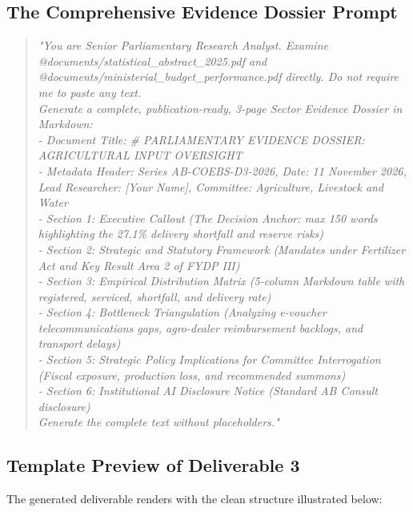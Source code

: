 \documentclass[11pt, a4paper]{report}
\begin{document}
\subsection{The Comprehensive Evidence Dossier Prompt}
\begin{quote}
\small
\textit{"You are Senior Parliamentary Research Analyst. Examine @documents/statistical\_abstract\_2025.pdf and @documents/ministerial\_budget\_performance.pdf directly. Do not require me to paste any text. \\
Generate a complete, publication-ready, 3-page Sector Evidence Dossier in Markdown: \\
- Document Title: \# PARLIAMENTARY EVIDENCE DOSSIER: AGRICULTURAL INPUT OVERSIGHT \\
- Metadata Header: Series AB-COEBS-D3-2026, Date: 11 November 2026, Lead Researcher: [Your Name], Committee: Agriculture, Livestock and Water \\
- Section 1: Executive Callout (The Decision Anchor: max 150 words highlighting the 27.1\% delivery shortfall and reserve risks) \\
- Section 2: Strategic and Statutory Framework (Mandates under Fertilizer Act and Key Result Area 2 of FYDP III) \\
- Section 3: Empirical Distribution Matrix (5-column Markdown table with registered, serviced, shortfall, and delivery rate) \\
- Section 4: Bottleneck Triangulation (Analyzing e-voucher telecommunications gaps, agro-dealer reimbursement backlogs, and transport delays) \\
- Section 5: Strategic Policy Implications for Committee Interrogation (Fiscal exposure, production loss, and recommended summons) \\
- Section 6: Institutional AI Disclosure Notice (Standard AB Consult disclosure) \\
Generate the complete text without placeholders."}
\end{quote}

\subsection{Template Preview of Deliverable 3}
The generated deliverable renders with the clean structure illustrated below:
\end{document}
